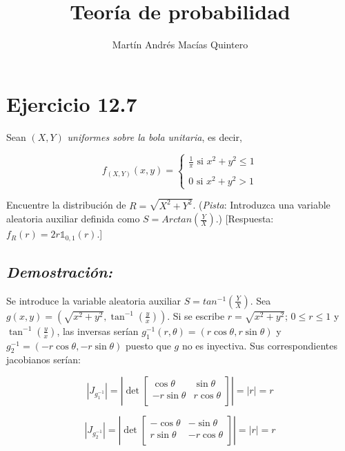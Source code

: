 \documentclass[]{article}
\title{Teoría de probabilidad}
\author{Martín Andrés Macías Quintero}
\date{}
\begin{document}
\maketitle

\section{Ejercicio 12.7}\label{ejercicio-12.7}

Sean \((X, Y)\) \emph{uniformes sobre la bola unitaria}, es decir,

\[
f_{(X, Y)} (x,y) =
\begin{cases}
\frac{1}{\pi}\text{ si } x^2+y^2\leq 1\\
\\
0 \text{ si } x^2+y^2 > 1
\end{cases}
\]

Encuentre la distribución de \(R=\sqrt{X^2+Y^2}\). (\emph{Pista}:
Introduzca una variable aleatoria auxiliar definida como
\(S=Arctan\left(\frac{Y}{X}\right)\).) {[}Respuesta:
\(f_R(r)=2r\mathbb{1}_{0,1}(r)\).{]}

\subsection{\texorpdfstring{\emph{Demostración:}}{Demostración:}}\label{demostracion}

Se introduce la variable aleatoria auxiliar
\(S=tan^{-1} \left(\frac{Y}{X}\right)\). Sea
\(g(x,y)=\left( \sqrt{x^2+y^2}, \tan^{-1} \left(\frac{y}{x}\right) \right)\).
Si se escribe \(r=\sqrt{x^2+y^2}\); \(0\leq r\leq 1\) y
\(\tan^{-1} \left(\frac{y}{x}\right)\), las inversas serían
\(g_1^{-1}(r,\theta)=(r\cos\theta, r\sin\theta)\) y
\(g_2^{-1}=(-r\cos\theta, -r\sin\theta)\) puesto que \(g\) no es
inyectiva. Sus correspondientes jacobianos serían:

\begin{equation}
\left| J_{g_1^{-1}}  \right|
=\left| \det 
\begin{bmatrix} 
\cos\theta &  \sin\theta \\
-r\sin\theta &  r\cos\theta \\
\end{bmatrix}  \right|
=|r|=r
\end{equation}

\begin{equation}
\left| J_{g_2^{-1}}  \right|
=\left| \det 
\begin{bmatrix} 
-\cos\theta &  -\sin\theta \\
r\sin\theta &  -r\cos\theta \\
\end{bmatrix}  \right|
=|r|=r
\end{equation}
\end{document}

